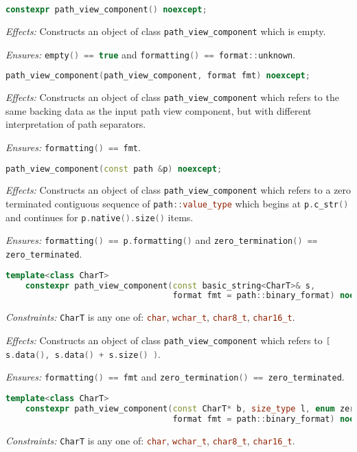 \documentclass[11pt]{article}
\newcommand{\code}[2][cpp]{\lstinline[language=#1,basicstyle=\small\ttfamily]{#2}}
\newcommand{\desc}[1]{\textit{#1}}
\newcommand{\constraints}{\desc{Constraints: }}
\newcommand{\effects}{\desc{Effects: }}
\newcommand{\ensures}{\desc{Ensures: }}
\begin{document}
\begin{lstlisting}[language=cpp]
   constexpr path_view_component() noexcept;
\end{lstlisting}

\effects Constructs an object of class \code{path_view_component} which is empty.

\ensures \code{empty() == true} and \code{formatting() == format::unknown}.\\

\begin{lstlisting}[language=cpp]
    path_view_component(path_view_component, format fmt) noexcept;
\end{lstlisting}

\effects Constructs an object of class \code{path_view_component} which refers to the same backing data as the input path view component, but with different interpretation of path separators.

\ensures \code{formatting() == fmt}.\\

\begin{lstlisting}[language=cpp]
    path_view_component(const path &p) noexcept;
\end{lstlisting}

\effects Constructs an object of class \code{path_view_component} which refers to a zero terminated contiguous sequence of \code{path::value_type} which begins at \code{p.c_str()} and continues for \code{p.native().size()} items.

\ensures \code{formatting() == p.formatting()} and \code{zero_termination() == zero_terminated}.\\

\begin{lstlisting}[language=cpp]
    template<class CharT>
    constexpr path_view_component(const basic_string<CharT>& s,
                                  format fmt = path::binary_format) noexcept;
\end{lstlisting}
\constraints \code{CharT} is any one of: \code{char}, \code{wchar_t}, \code{char8_t}, \code{char16_t}.

\effects Constructs an object of class \code{path_view_component} which refers to \code{[ s.data(), s.data() + s.size() )}.

\ensures \code{formatting() == fmt} and \code{zero_termination() == zero_terminated}.\\

\begin{lstlisting}[language=cpp]
    template<class CharT>
    constexpr path_view_component(const CharT* b, size_type l, enum zero_termination zt,
                                  format fmt = path::binary_format) noexcept;
\end{lstlisting}
\constraints \code{CharT} is any one of: \code{char}, \code{wchar_t}, \code{char8_t}, \code{char16_t}.
\end{document}
